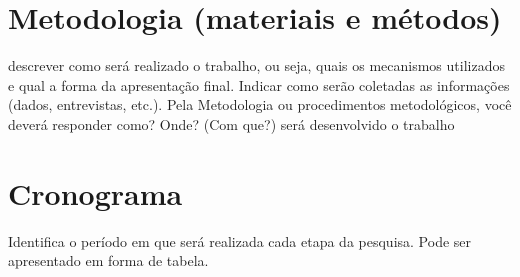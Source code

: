 \documentclass[a4paper,11pt]{article}
\begin{document}
\section{Metodologia (materiais e métodos)}  
descrever como será realizado o trabalho, ou seja, quais os mecanismos utilizados e qual a forma da apresentação final.  Indicar como serão coletadas as informações (dados, entrevistas, etc.). Pela Metodologia ou procedimentos metodológicos, você deverá responder como? Onde? (Com que?) será desenvolvido o trabalho

\section{Cronograma}  
Identifica o período em que será realizada cada etapa da pesquisa. Pode ser apresentado em forma de tabela.






\end{document}
